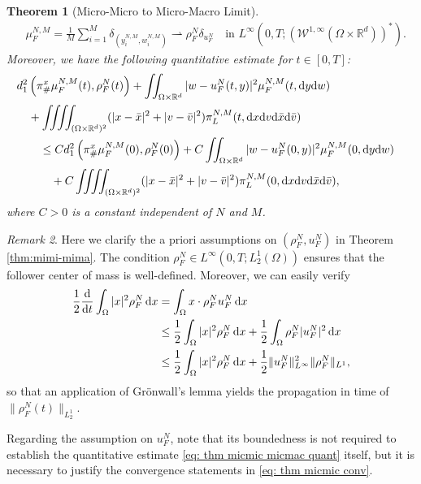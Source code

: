\documentclass[10pt, reqno]{amsart}
\newtheorem{theorem}{Theorem}[section]
\theoremstyle{definition}
\theoremstyle{remark}
\newtheorem{remark}[theorem]{Remark}
\numberwithin{equation}{section}
\newcommand{\dx}{\textnormal{d}x}
\newcommand{\dy}{\textnormal{d}y}
\newcommand{\dv}{\textnormal{d}v}
\newcommand{\dw}{\textnormal{d}w}
\newcommand{\ddt}{\frac{\textnormal{d}}{\textnormal{d}t}}
\newcommand{\calW}{\mathcal W}
\newcommand{\R}{\mathbb{R}}
\newcommand{\weakto}{\rightharpoonup}
\begin{document}
\begin{theorem}[Micro-Micro to Micro-Macro Limit]
\begin{equation}
\begin{split}
       & \mu_F^{N,M} = \frac{1}{M}\sum_{i=1}^M \delta_{(y_i^{N,M}, w_i^{N,M})} \weakto \rho_F^N \delta_{u_F^N}\quad \text{in }  L^\infty(0,T;(  \calW^{1,\infty}     (\Omega \times \R^d))^*).
    \end{split}
\end{equation}
Moreover, we have the following quantitative estimate for $t \in [0,T]$:
\begin{align}\label{eq: thm micmic micmac quant}
\begin{aligned}
&d_1^2\left(\pi^x_\#\mu_F^{N,M}(t), \rho_F^N(t) \right) + \iint_{\Omega \times \R^d} |w - u_F^N(t,y)|^2 \mu_F^{N,M}(t,\dy \dw)  \cr
&\quad + \iiiint_{(\Omega \times \R^d)^2} (|x-\bar x|^2 + |v-\bar v|^2) \pi_L^{N,M}(t,\dx \dv {\rm d}\bar x {\rm d}\bar v) \cr
&\qquad \leq  Cd_1^2\left(\pi^x_\#\mu_F^{N,M}(0), \rho_F^N(0) \right)+ C\iint_{\Omega \times \R^d} |w - u_F^N(0,y)|^2 \mu_F^{N,M}(0,\dy \dw)  \cr
&\quad \qquad +C\iiiint_{(\Omega \times \R^d)^2} (|x-\bar x|^2 + |v-\bar v|^2) \pi_L^{N,M}(0,\dx \dv {\rm d}\bar x {\rm d}\bar v),
\end{aligned}
\end{align}
where $C>0$ is a constant independent of $N$ and $M$.
\end{theorem} 

\begin{remark}\label{rmk_mom}
Here we clarify the a priori assumptions on $(\rho_F^N, u_F^N)$ in Theorem \ref{thm:mimi-mima}. The condition $\rho_F^N \in L^\infty(0,T; L^1_2(\Omega))$ ensures that the follower center of mass is well-defined. Moreover, we can easily verify
\begin{align*}
        \frac12\ddt \int_{\Omega} |x|^2 \rho_F^N\,\dx 
        &= \int_{\Omega} x \cdot \rho_F^N u_F^N \,\dx  \\
        &\le \frac12\int_{\Omega} |x|^2 \rho_F^N\,\dx + \frac12\int_{\Omega} \rho_F^N |u_F^N|^2 \,\dx  \\
        &\leq  \frac12\int_{\Omega} |x|^2 \rho_F^N\,\dx + \frac12\|u_F^N\|_{L^\infty}^2\|\rho_F^N\|_{L^1},
\end{align*}
so that an application of Gr\"onwall's lemma yields the propagation in time of $\|\rho_F^N(t)\|_{L^1_2}$.

Regarding the assumption on $u_F^N$, note that its boundedness is not required to establish the quantitative estimate \eqref{eq: thm micmic micmac quant} itself, but it is necessary to justify the convergence statements in \eqref{eq: thm micmic conv}.
\end{remark}
\end{document}
